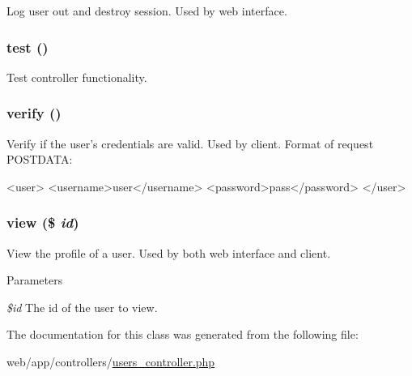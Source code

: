 \label{class_users_controller_a082405d89acd6835c3a7c7a08a7adbab}
Log user out and destroy session. Used by web interface. \hypertarget{class_users_controller_ad69dd4607977cae05ebe19d1ae604fb1}{
\subsubsection[{test}]{\setlength{\rightskip}{0pt plus 5cm}test ()}}
\label{class_users_controller_ad69dd4607977cae05ebe19d1ae604fb1}
Test controller functionality. \hypertarget{class_users_controller_aa33600b6a1b28d0c4dfe4d468272aaa4}{
\subsubsection[{verify}]{\setlength{\rightskip}{0pt plus 5cm}verify ()}}
\label{class_users_controller_aa33600b6a1b28d0c4dfe4d468272aaa4}
Verify if the user's credentials are valid. Used by client. Format of request POSTDATA: 
\begin{DoxyCode}
 <user>
   <username>user</username>
   <password>pass</password>
 </user>
\end{DoxyCode}
 \hypertarget{class_users_controller_a93a99cdd06e6a3044ed7e56db0f9419a}{
\subsubsection[{view}]{\setlength{\rightskip}{0pt plus 5cm}view (\$ {\em id})}}
\label{class_users_controller_a93a99cdd06e6a3044ed7e56db0f9419a}
View the profile of a user. Used by both web interface and client. 
\begin{DoxyParams}{Parameters}
\item[{\em \$id}]The id of the user to view. \end{DoxyParams}


The documentation for this class was generated from the following file:\begin{DoxyCompactItemize}
\item 
web/app/controllers/\hyperlink{users__controller_8php}{users\_\-controller.php}\end{DoxyCompactItemize}
